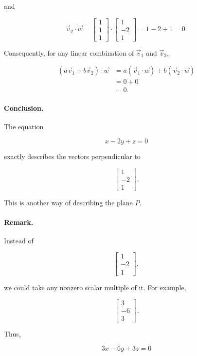 and

\[
\vec v_2\cdot\vec w
=
\begin{bmatrix}
1\\
1\\
1
\end{bmatrix}
\cdot
\begin{bmatrix}
1\\
-2\\
1
\end{bmatrix}
=
1-2+1
=
0.
\]

Consequently, for any linear combination of $\vec v_1$ and $\vec v_2$,

\[
\begin{aligned}
(a\vec v_1+b\vec v_2)\cdot\vec w
&=
a(\vec v_1\cdot\vec w)
+
b(\vec v_2\cdot\vec w)\\
&=
0+0\\
&=
0.
\end{aligned}
\]

\paragraph{Conclusion.}
The equation

\[
x-2y+z=0
\]

exactly describes the vectors perpendicular to

\[
\begin{bmatrix}
1\\
-2\\
1
\end{bmatrix}.
\]

This is another way of describing the plane $P$.

\paragraph{Remark.}
Instead of

\[
\begin{bmatrix}
1\\
-2\\
1
\end{bmatrix},
\]

we could take any nonzero scalar multiple of it. For example,

\[
\begin{bmatrix}
3\\
-6\\
3
\end{bmatrix}.
\]

Thus,

\[
3x-6y+3z=0
\]

